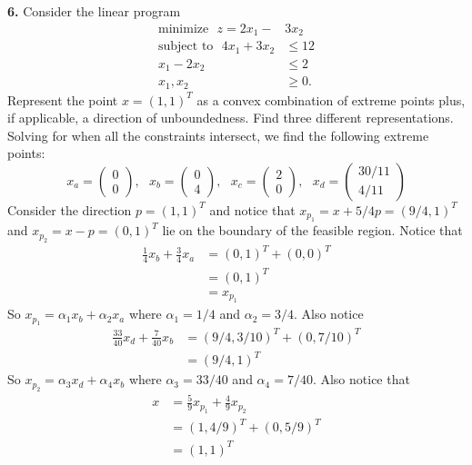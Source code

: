 \documentclass{article}
\begin{document}
\textbf{6.} Consider the linear program
\begin{align*}
    \text{minimize} \:\:\: z = 2x_1 - &3x_2\\
    \text{subject to} \:\:\: 4x_1 + 3x_2 &\leq 12\\
    x_1 - 2x_2 &\leq 2\\
    x_1, x_2 &\geq 0.
\end{align*}
Represent the point $x = (1,1)^T$ as a convex combination of extreme points plus, if applicable, a direction of unboundedness. Find three different representations.
\newline\newline
Solving for when all the constraints intersect, we find the following extreme points:
\[x_a = \begin{pmatrix}
    0\\
    0
\end{pmatrix}
,\:\:\:
x_b = \begin{pmatrix}
    0\\
    4
\end{pmatrix}
,\:\:\:
x_c = \begin{pmatrix}
    2\\
    0
\end{pmatrix}
,\:\:\:
x_d = \begin{pmatrix}
    30/11\\
    4/11
\end{pmatrix}
\]
Consider the direction $p = (1,1)^T$ and notice that $x_{p_1} = x + 5/4p = (9/4,1)^T$ and $x_{p_2} = x - p = (0,1)^T$ lie on the boundary of the feasible region. Notice that 
\begin{align*}
    \frac{1}{4}x_b + \frac{3}{4}x_a &= (0,1)^T + (0,0)^T\\
    &= (0,1)^T\\
    &= x_{p_1}
\end{align*}
So $x_{p_1} = \alpha_1x_b + \alpha_2x_a$ where $\alpha_1 = 1/4$ and $\alpha_2 = 3/4$. Also notice
\begin{align*}
    \frac{33}{40}x_d + \frac{7}{40}x_b &= (9/4, 3/10)^T + (0, 7/10)^T\\
    &= (9/4, 1)^T
\end{align*}
So $x_{p_2} = \alpha_3x_d + \alpha_4x_b$ where $\alpha_3 = 33/40$ and $\alpha_4 = 7/40$. Also notice that
\begin{align*}
    x &= \frac{5}{9}x_{p_1} + \frac{4}{9}x_{p_2}\\
    &= (1,4/9)^T + (0,5/9)^T\\
    &= (1,1)^T
\end{align*}
\end{document}
